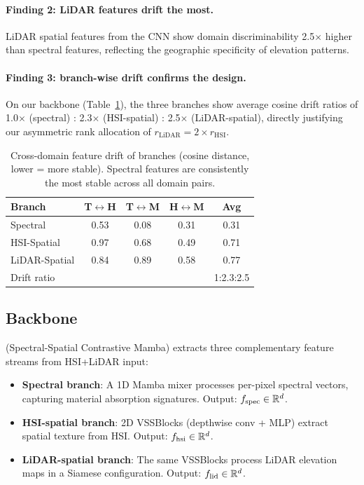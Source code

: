 \paragraph{Finding 2: LiDAR features drift the most.}
LiDAR spatial features from the CNN show domain discriminability 2.5$\times$ higher than spectral features, reflecting the geographic specificity of elevation patterns.

\paragraph{Finding 3: \backbonename{} branch-wise drift confirms the design.}
On our \backbonename{} backbone (Table~\ref{tab:drift}), the three branches show average cosine drift ratios of 1.0$\times$ (spectral) : 2.3$\times$ (HSI-spatial) : 2.5$\times$ (LiDAR-spatial), directly justifying our asymmetric rank allocation of $r_{\text{LiDAR}} = 2 \times r_{\text{HSI}}$.

\begin{table}[t]
\centering
\caption{Cross-domain feature drift of \backbonename{} branches (cosine distance, lower = more stable). Spectral features are consistently the most stable across all domain pairs.}
\label{tab:drift}
\begin{tabular}{lccc|c}
\toprule
Branch & T$\leftrightarrow$H & T$\leftrightarrow$M & H$\leftrightarrow$M & Avg \\
\midrule
Spectral & 0.53 & 0.08 & 0.31 & 0.31 \\
HSI-Spatial & 0.97 & 0.68 & 0.49 & 0.71 \\
LiDAR-Spatial & 0.84 & 0.89 & 0.58 & 0.77 \\
\midrule
Drift ratio & & & & 1:2.3:2.5 \\
\bottomrule
\end{tabular}
\end{table}

\subsection{\backbonename{} Backbone}
\label{sec:backbone}

\backbonename{} (Spectral-Spatial Contrastive Mamba) extracts three complementary feature streams from HSI+LiDAR input:

\begin{itemize}
    \item \textbf{Spectral branch}: A 1D Mamba mixer processes per-pixel spectral vectors, capturing material absorption signatures. Output: $f_{\mathrm{spec}} \in \mathbb{R}^{d}$.
    \item \textbf{HSI-spatial branch}: 2D VSSBlocks (depthwise conv + MLP) extract spatial texture from HSI. Output: $f_{\mathrm{hsi}} \in \mathbb{R}^{d}$.
    \item \textbf{LiDAR-spatial branch}: The same VSSBlocks process LiDAR elevation maps in a Siamese configuration. Output: $f_{\mathrm{lid}} \in \mathbb{R}^{d}$.
\end{itemize}

